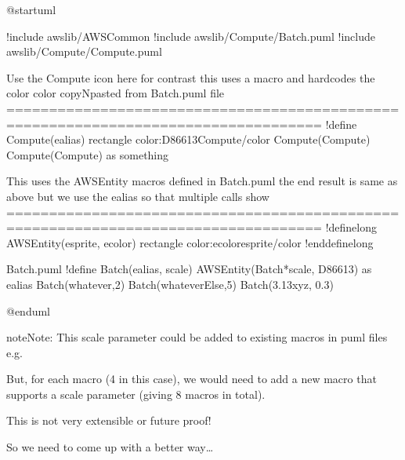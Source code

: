 \documentclass[letterpaper,10pt,english]{sphinxmanual}
\begin{document}
%
\begin{sphinxVerbatim}[commandchars=\\\{\},numbers=left,firstnumber=1,stepnumber=1]
@startuml 

!include \PYGZlt{}awslib/AWSCommon\PYGZgt{}
!include \PYGZlt{}awslib/Compute/Batch.puml\PYGZgt{}
!include \PYGZlt{}awslib/Compute/Compute.puml\PYGZgt{}


\PYGZsq{}Use the Compute icon here for contrast
\PYGZsq{}this uses a macro \PYGZhy{} and hardcodes the color \PYGZhy{} color copyNpasted from Batch.puml file
\PYGZsq{}===================================================================================
!define Compute(e\PYGZus{}alias) rectangle \PYGZdq{}\PYGZlt{}color:\PYGZsh{}D86613\PYGZgt{}\PYGZlt{}\PYGZdl{}Compute\PYGZgt{}\PYGZlt{}/color\PYGZgt{}\PYGZdq{}  
Compute(Compute) 
Compute(Compute) as something


\PYGZsq{} This uses the AWSEntity macros defined in Batch.puml
\PYGZsq{} the end result is same as above \PYGZhy{} but we use the e\PYGZus{}alias so that multiple calls show
\PYGZsq{}===================================================================================
!definelong AWSEntity(e\PYGZus{}sprite, e\PYGZus{}color)
rectangle \PYGZdq{}\PYGZlt{}color:e\PYGZus{}color\PYGZgt{}\PYGZlt{}\PYGZdl{}e\PYGZus{}sprite\PYGZgt{}\PYGZlt{}/color\PYGZgt{}\PYGZdq{} 
!enddefinelong

\PYGZsq{} Batch.puml
!define Batch(e\PYGZus{}alias, scale) AWSEntity(Batch*scale, \PYGZsh{}D86613) as e\PYGZus{}alias
Batch(whatever,2)
Batch(whateverElse,5) 
Batch(3.13xyz, 0.3) 


@enduml
\end{sphinxVerbatim}
\sphinxresetverbatimhllines

\begin{sphinxadmonition}{note}{Note:}
This scale parameter could be added to existing macros in puml files e.g.

But, for each macro (4 in this case), we would need to add a new macro that supports a scale parameter (giving 8 macros in total).

This is not very extensible or future proof!

So we need to come up with a better way…
\end{sphinxadmonition}
\end{document}
